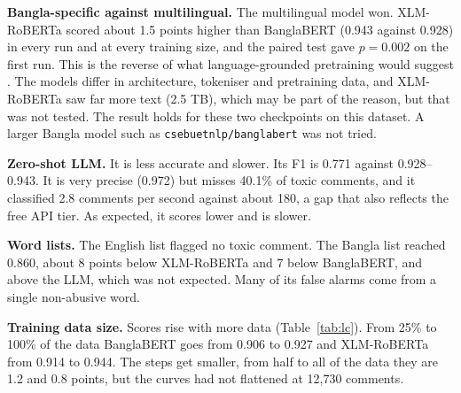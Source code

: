 \textbf{Bangla-specific against multilingual.} The multilingual model won. XLM-RoBERTa scored about 1.5 points higher than BanglaBERT (0.943 against 0.928) in every run and at every training size, and the paired test gave $p=0.002$ on the first run. This is the reverse of what language-grounded pretraining would suggest \cite{hasan2025banglamultihate}. The models differ in architecture, tokeniser and pretraining data, and XLM-RoBERTa saw far more text (2.5 TB), which may be part of the reason, but that was not tested. The result holds for these two checkpoints on this dataset. A larger Bangla model such as \texttt{csebuetnlp/banglabert} \cite{bhattacharjee2022banglabert} was not tried.

\textbf{Zero-shot LLM.} It is less accurate and slower. Its F1 is 0.771 against 0.928--0.943. It is very precise (0.972) but misses 40.1\% of toxic comments, and it classified 2.8 comments per second against about 180, a gap that also reflects the free API tier. As expected, it scores lower and is slower.

\textbf{Word lists.} The English list flagged no toxic comment. The Bangla list reached 0.860, about 8 points below XLM-RoBERTa and 7 below BanglaBERT, and above the LLM, which was not expected. Many of its false alarms come from a single non-abusive word.

\textbf{Training data size.} Scores rise with more data (Table~\ref{tab:lc}). From 25\% to 100\% of the data BanglaBERT goes from 0.906 to 0.927 and XLM-RoBERTa from 0.914 to 0.944. The steps get smaller, from half to all of the data they are 1.2 and 0.8 points, but the curves had not flattened at 12,730 comments.
